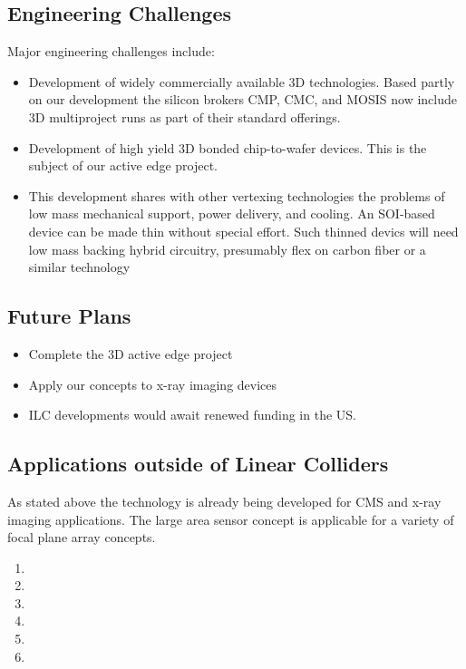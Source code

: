 \subsection{Engineering Challenges}
Major  engineering challenges include:
\begin{itemize}
\item Development of widely commercially available 3D technologies.  Based partly on our development the silicon brokers CMP, CMC, and MOSIS now include 3D multiproject runs as part of their standard offerings.
\item Development of high yield 3D bonded chip-to-wafer devices.  This is the subject of our active edge project.
\item This development shares with other vertexing technologies the problems of low mass mechanical support, power delivery, and cooling. An SOI-based device can be made thin without special effort. Such thinned devics will need low mass backing hybrid circuitry, presumably flex on carbon fiber or a similar technology
\end{itemize}

\subsection{Future Plans}
\begin{itemize}
\item Complete the 3D active edge project
\item Apply our concepts to x-ray imaging devices
\item ILC developments would await renewed funding in the US.
\end{itemize}

\subsection{Applications outside of Linear Colliders}
As stated above the technology is already being developed for CMS and x-ray imaging applications.  The large area sensor concept is applicable for a variety of focal plane array concepts.

\begin{enumerate}
\item {}
\item {}
\item {}
\item {}
\item {}
\item {}
\end{enumerate}
